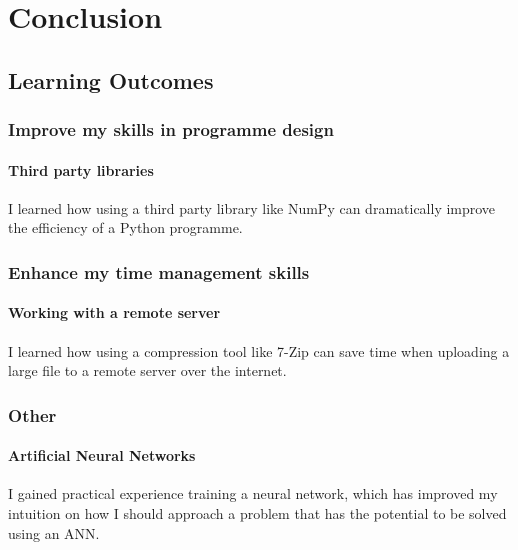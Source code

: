\section{Conclusion}
    \subsection{Learning Outcomes}
        \subsubsection{Improve my skills in programme design}
            \paragraph{Third party libraries} I learned how using a third party library like NumPy can dramatically improve the efficiency of a Python programme.
        \subsubsection{Enhance my time management skills}
            \paragraph{Working with a remote server} I learned how using a compression tool like 7-Zip can save time when uploading a large file to a remote server over the internet.
        \subsubsection{Other}
            \paragraph{Artificial Neural Networks} I gained practical experience training a neural network, which has improved my intuition on how I should approach a problem that has the potential to be solved using an ANN.